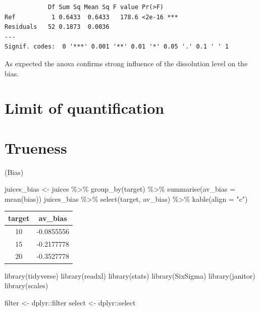 \documentclass[
]{book}
\newenvironment{Shaded}{\begin{snugshade}}{\end{snugshade}}
\newcommand{\AttributeTok}[1]{\textcolor[rgb]{0.77,0.63,0.00}{#1}}
\newcommand{\FunctionTok}[1]{\textcolor[rgb]{0.00,0.00,0.00}{#1}}
\newcommand{\NormalTok}[1]{#1}
\newcommand{\OtherTok}[1]{\textcolor[rgb]{0.56,0.35,0.01}{#1}}
\newcommand{\SpecialCharTok}[1]{\textcolor[rgb]{0.00,0.00,0.00}{#1}}
\newcommand{\StringTok}[1]{\textcolor[rgb]{0.31,0.60,0.02}{#1}}
\begin{document}
\begin{verbatim}
            Df Sum Sq Mean Sq F value Pr(>F)    
Ref          1 0.6433  0.6433   178.6 <2e-16 ***
Residuals   52 0.1873  0.0036                   
---
Signif. codes:  0 '***' 0.001 '**' 0.01 '*' 0.05 '.' 0.1 ' ' 1
\end{verbatim}

As expected the anova confirms strong influence of the dissolution level on the bias.

\hypertarget{limit-of-quantification}{%
\section{Limit of quantification}\label{limit-of-quantification}}

\hypertarget{trueness}{%
\section{Trueness}\label{trueness}}

(Bias)

\begin{Shaded}
\begin{Highlighting}[]
\NormalTok{juices\_bias }\OtherTok{\textless{}{-}}\NormalTok{ juices }\SpecialCharTok{\%\textgreater{}\%}
  \FunctionTok{group\_by}\NormalTok{(target) }\SpecialCharTok{\%\textgreater{}\%}
  \FunctionTok{summarise}\NormalTok{(}\AttributeTok{av\_bias =} \FunctionTok{mean}\NormalTok{(bias))}
\NormalTok{juices\_bias }\SpecialCharTok{\%\textgreater{}\%}
  \FunctionTok{select}\NormalTok{(target, av\_bias) }\SpecialCharTok{\%\textgreater{}\%}
  \FunctionTok{kable}\NormalTok{(}\AttributeTok{align =} \StringTok{"c"}\NormalTok{)}
\end{Highlighting}
\end{Shaded}

\begin{tabular}{c|c}
\hline
target & av\_bias\\
\hline
10 & -0.0855556\\
\hline
15 & -0.2177778\\
\hline
20 & -0.3527778\\
\hline
\end{tabular}

\begin{Shaded}
\begin{Highlighting}[]
\FunctionTok{library}\NormalTok{(tidyverse)}
\FunctionTok{library}\NormalTok{(readxl)}
\FunctionTok{library}\NormalTok{(stats)}
\FunctionTok{library}\NormalTok{(SixSigma)}
\FunctionTok{library}\NormalTok{(janitor)}
\FunctionTok{library}\NormalTok{(scales)}

\NormalTok{filter }\OtherTok{\textless{}{-}}\NormalTok{ dplyr}\SpecialCharTok{::}\NormalTok{filter}
\NormalTok{select }\OtherTok{\textless{}{-}}\NormalTok{ dplyr}\SpecialCharTok{::}\NormalTok{select}
\end{Highlighting}
\end{Shaded}
\end{document}

